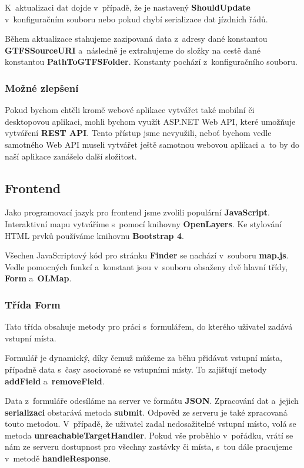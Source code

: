K~aktualizaci dat dojde v~případě, že je nastavený \textbf{ShouldUpdate} v~konfiguračním souboru nebo pokud chybí serializace dat jízdních řádů.

Během aktualizace stahujeme zazipovaná data z~adresy dané konstantou \textbf{GTFSSourceURI} a~následně je extrahujeme do složky na cestě dané konstantou \textbf{PathToGTFSFolder}. Konstanty pochází z~konfiguračního souboru.

\subsubsection{Možné zlepšení}

Pokud bychom chtěli kromě webové aplikace vytvářet také mobilní či desktopovou aplikaci, mohli bychom využít ASP.NET Web API, které umožňuje vytváření \textbf{REST API}. Tento přístup jsme nevyužili, neboť bychom vedle samotného Web API museli vytvářet ještě samotnou webovou aplikaci a~to by do naší aplikace zanášelo další složitost.


\subsection{Frontend}

Jako programovací jazyk pro frontend jsme zvolili populární \textbf{JavaScript}. Interaktivní mapu vytváříme s~pomocí knihovny \textbf{OpenLayers}. Ke stylování HTML prvků používáme knihovnu \textbf{Bootstrap 4}.

Všechen JavaScriptový kód pro stránku \textbf{Finder} se nachází v~souboru \textbf{map.js}. Vedle pomocných funkcí a~konstant jsou v~souboru obsaženy dvě hlavní třídy, \textbf{Form} a~\textbf{OLMap}.


\subsubsection{Třída Form}

Tato třída obsahuje metody pro práci s~formulářem, do kterého uživatel zadává vstupní místa.

Formulář je dynamický, díky čemuž můžeme za běhu přidávat vstupní místa, případně data s~časy asociované se vstupními místy. To zajišťují metody \textbf{addField} a~\textbf{removeField}.

Data z~formuláře odesíláme na server ve formátu \textbf{JSON}. Zpracování dat a~jejich \textbf{serializaci} obstarává metoda \textbf{submit}. Odpověd ze serveru je také zpracovaná touto metodou. V~případě, že uživatel zadal nedosažitelné vstupní místo, volá se metoda \textbf{unreachableTargetHandler}. Pokud vše proběhlo v~pořádku, vrátí se nám ze serveru dostupnost pro všechny zastávky či místa, s~tou dále pracujeme v~metodě \textbf{handleResponse}.

